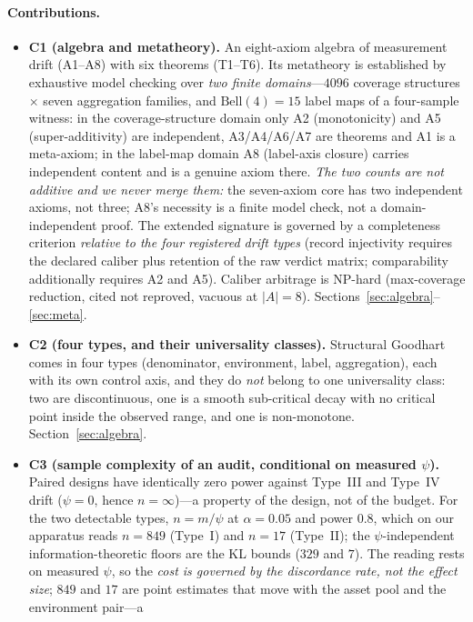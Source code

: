 \documentclass{article}
\begin{document}
\paragraph{Contributions.}
\begin{itemize}\itemsep2pt
  \item \textbf{C1 (algebra and metatheory).} An eight-axiom algebra of measurement drift (A1--A8) with six
  theorems (T1--T6). Its metatheory is established by exhaustive model checking over \emph{two finite
  domains}---$4096$ coverage structures $\times$ seven aggregation families, and $\mathrm{Bell}(4)=15$ label
  maps of a four-sample witness: in the coverage-structure domain only A2 (monotonicity) and A5
  (super-additivity) are independent, A3/A4/A6/A7 are theorems and A1 is a meta-axiom; in the label-map
  domain A8 (label-axis closure) carries independent content and is a genuine axiom there. \emph{The two
  counts are not additive and we never merge them:} the seven-axiom core has two independent axioms, not
  three; A8's necessity is a finite model check, not a domain-independent proof. The extended signature is
  governed by a completeness criterion \emph{relative to the four registered drift types} (record injectivity
  requires the declared caliber plus retention of the raw verdict matrix; comparability additionally requires
  A2 and A5). Caliber arbitrage is NP-hard (max-coverage reduction, cited not reproved, vacuous at $|A|=8$).
  Sections~\ref{sec:algebra}--\ref{sec:meta}.
  \item \textbf{C2 (four types, and their universality classes).} Structural Goodhart comes in four types
  (denominator, environment, label, aggregation), each with its own control axis, and they do \emph{not}
  belong to one universality class: two are discontinuous, one is a smooth sub-critical decay with no
  critical point inside the observed range, and one is non-monotone. Section~\ref{sec:algebra}.
  \item \textbf{C3 (sample complexity of an audit, conditional on measured $\psi$).} Paired designs
  have identically zero power against Type~III and Type~IV drift ($\psi=0$, hence $n=\infty$)---a
  property of the design, not of the budget. For the two detectable types, $n=m/\psi$ at
  $\alpha=0.05$ and power $0.8$, which on our apparatus reads $n=849$ (Type~I) and $n=17$ (Type~II); the
  $\psi$-independent information-theoretic floors are the KL bounds ($329$ and $7$). The
  reading rests on measured $\psi$, so the \emph{cost is governed by the discordance rate, not the effect
  size}; $849$ and $17$ are point estimates that move with the asset pool and the environment pair---a

\end{itemize}
\end{document}
